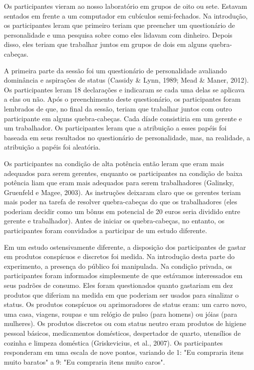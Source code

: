 \documentclass{article}
\begin{document}
Os participantes vieram ao nosso laboratório em grupos de oito ou sete. Estavam sentados em frente a um computador em cubículos semi-fechados. Na introdução, os participantes leram que primeiro teriam que preencher um questionário de personalidade e uma pesquisa sobre como eles lidavam com dinheiro. Depois disso, eles teriam que trabalhar juntos em grupos de dois em alguns quebra-cabeças.

A primeira parte da sessão foi um questionário de personalidade avaliando dominância e aspirações de status (Cassidy \& Lynn, 1989; Mead \& Maner, 2012). Os participantes leram 18 declarações e indicaram se cada uma delas se aplicava a elas ou não. Após o preenchimento deste questionário, os participantes foram lembrados de que, no final da sessão, teriam que trabalhar juntos com outro participante em alguns quebra-cabeças. Cada díade consistiria em um gerente e um trabalhador. Os participantes leram que a atribuição a esses papéis foi baseada em seus resultados no questionário de personalidade, mas, na realidade, a atribuição a papéis foi aleatória.

Os participantes na condição de alta potência então leram que eram mais adequados para serem gerentes, enquanto os participantes na condição de baixa potência liam que eram mais adequados para serem trabalhadores (Galinsky, Gruenfeld e Magee, 2003). As instruções deixaram claro que os gerentes teriam mais poder na tarefa de resolver quebra-cabeças do que os trabalhadores (eles poderiam decidir como um bônus em potencial de 20 euros seria dividido entre gerente e trabalhador). Antes de iniciar os quebra-cabeças, no entanto, os participantes foram convidados a participar de um estudo diferente.

Em um estudo ostensivamente diferente, a disposição dos participantes de gastar em produtos conspícuos e discretos foi medida. Na introdução desta parte do experimento, a presença do público foi manipulada. Na condição privada, os participantes foram informados simplesmente de que estávamos interessados em seus padrões de consumo. Eles foram questionados quanto gastariam em dez produtos que diferiam na medida em que poderiam ser usados para sinalizar o status. Os produtos conspícuos ou aprimoradores de status eram: um carro novo, uma casa, viagens, roupas e um relógio de pulso (para homens) ou jóias (para mulheres). Os produtos discretos ou com status neutro eram produtos de higiene pessoal básicos, medicamentos domésticos, despertador de quarto, utensílios de cozinha e limpeza doméstica (Griskevicius, et al., 2007). Os participantes responderam em uma escala de nove pontos, variando de 1: "Eu compraria itens muito baratos" a 9: "Eu compraria itens muito caros".
\end{document}
